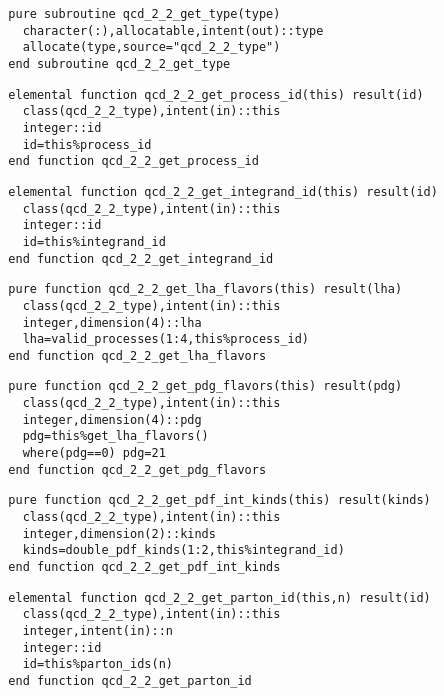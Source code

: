 \begin{Verbatim}
  pure subroutine qcd_2_2_get_type(type)
    character(:),allocatable,intent(out)::type
    allocate(type,source="qcd_2_2_type")
  end subroutine qcd_2_2_get_type
\end{Verbatim}

\begin{Verbatim}
  elemental function qcd_2_2_get_process_id(this) result(id)
    class(qcd_2_2_type),intent(in)::this
    integer::id
    id=this%process_id
  end function qcd_2_2_get_process_id
\end{Verbatim}

\begin{Verbatim}
  elemental function qcd_2_2_get_integrand_id(this) result(id)
    class(qcd_2_2_type),intent(in)::this
    integer::id
    id=this%integrand_id
  end function qcd_2_2_get_integrand_id
\end{Verbatim}

\begin{Verbatim}
  pure function qcd_2_2_get_lha_flavors(this) result(lha)
    class(qcd_2_2_type),intent(in)::this
    integer,dimension(4)::lha
    lha=valid_processes(1:4,this%process_id)
  end function qcd_2_2_get_lha_flavors
\end{Verbatim}

\begin{Verbatim}
  pure function qcd_2_2_get_pdg_flavors(this) result(pdg)
    class(qcd_2_2_type),intent(in)::this
    integer,dimension(4)::pdg
    pdg=this%get_lha_flavors()
    where(pdg==0) pdg=21
  end function qcd_2_2_get_pdg_flavors
\end{Verbatim}

\begin{Verbatim}
  pure function qcd_2_2_get_pdf_int_kinds(this) result(kinds)
    class(qcd_2_2_type),intent(in)::this
    integer,dimension(2)::kinds
    kinds=double_pdf_kinds(1:2,this%integrand_id)
  end function qcd_2_2_get_pdf_int_kinds
\end{Verbatim}

\begin{Verbatim}
  elemental function qcd_2_2_get_parton_id(this,n) result(id)
    class(qcd_2_2_type),intent(in)::this
    integer,intent(in)::n
    integer::id
    id=this%parton_ids(n)
  end function qcd_2_2_get_parton_id
\end{Verbatim}

